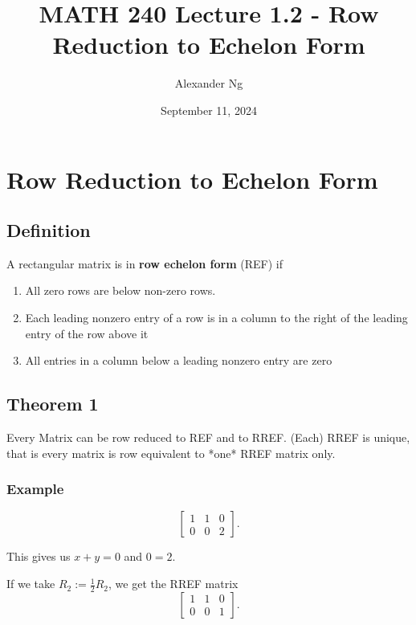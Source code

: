 \documentclass[12pt]{article}
\begin{document}
\title{MATH 240 Lecture 1.2 - Row Reduction to Echelon Form}
\author{Alexander Ng}
\date{September 11, 2024}

\maketitle

\section{Row Reduction to Echelon Form}

\subsection{Definition}
A rectangular matrix is in \textbf{row echelon form} (REF) if

\begin{enumerate}
  \item All zero rows are below non-zero rows.
  \item Each leading nonzero entry of a row is in a column to the right of the
  leading entry of the row above it
  \item All entries in a column below a leading nonzero entry are zero
\end{enumerate}

\subsection{Theorem 1}

Every Matrix can be row reduced to REF and to RREF.
(Each) RREF is unique, that is every matrix is row equivalent to *one*
RREF matrix only.

\subsubsection{Example}

\[
  \begin{bmatrix}
    1 & 1 & 0 \\
    0 & 0 & 2
  \end{bmatrix} 
.\] 

This gives us $x+y = 0$ and $0=2$.

If we take $ R_2 := \frac{1}{2} R_2$, we get the RREF matrix
\[
  \begin{bmatrix}
    1 & 1 & 0 \\
    0 & 0 & 1
  \end{bmatrix}
.\]
\end{document}
